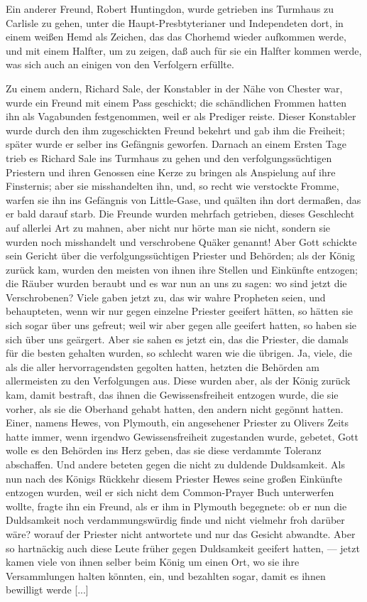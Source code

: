 Ein anderer Freund, Robert Huntingdon, wurde getrieben
ins Turmhaus zu Carlisle zu gehen, unter die Haupt-Presbtyterianer 
und Independeten dort, in einem weißen Hemd als
Zeichen, das das Chorhemd wieder aufkommen werde, und mit
einem Halfter, um zu zeigen, daß auch für sie ein Halfter kommen
werde, was sich auch an einigen von den Verfolgern erfüllte.

Zu einem andern, Richard Sale, der Konstabler in der Nähe
von Chester war, wurde ein Freund mit einem Pass geschickt;
die schändlichen \glqq Frommen\grqq{} hatten ihn als Vagabunden 
festgenommen, weil er als Prediger reiste. Dieser Konstabler wurde
durch den ihm zugeschickten Freund bekehrt und gab ihm die
Freiheit; später wurde er selber ins Gefängnis geworfen. Darnach
an einem Ersten Tage trieb es Richard Sale ins Turmhaus zu
gehen und den verfolgungssüchtigen Priestern und ihren Genossen
eine Kerze zu bringen als Anspielung auf ihre Finsternis; aber
sie misshandelten ihn, und, so recht wie verstockte \glqq Fromme\grqq{}, warfen
sie ihn ins Gefängnis von Little-Gase, und quälten ihn dort dermaßen,
das er bald darauf starb. Die Freunde wurden mehrfach getrieben, 
dieses Geschlecht auf allerlei Art zu mahnen, aber nicht
nur hörte man sie nicht, sondern sie wurden noch misshandelt und
\glqq verschrobene Quäker\grqq{} genannt! Aber Gott schickte sein Gericht
über die verfolgungssüchtigen Priester und Behörden; als der
König zurück kam, wurden den meisten von ihnen ihre Stellen und
Einkünfte entzogen; die Räuber wurden beraubt und es war nun
an uns zu sagen: \glqq wo sind jetzt die Verschrobenen?\grqq{} Viele gaben
jetzt zu, das wir wahre Propheten seien, und behaupteten, wenn
wir nur gegen einzelne Priester geeifert hätten, so hätten sie sich
sogar über uns gefreut; weil wir aber gegen alle geeifert hatten,
so haben sie sich über uns geärgert. Aber sie sahen es jetzt ein,
das die Priester, die damals für die besten gehalten wurden, so
schlecht waren wie die übrigen. Ja, viele, die als die aller 
hervorragendsten gegolten hatten, hetzten die Behörden am 
allermeisten zu den Verfolgungen aus. Diese wurden aber, als der
König zurück kam, damit bestraft, das ihnen die Gewissensfreiheit
entzogen wurde, die sie vorher, als sie die Oberhand gehabt hatten,
den andern nicht gegönnt hatten. Einer, namens Hewes, von
Plymouth, ein angesehener Priester zu Olivers Zeits hatte immer,
wenn irgendwo Gewissensfreiheit zugestanden wurde, gebetet, Gott
wolle es den Behörden ins Herz geben, das sie diese verdammte
Toleranz abschaffen. Und andere beteten gegen \glqq die nicht zu
duldende Duldsamkeit\grqq{}. Als nun nach des Königs Rückkehr
diesem Priester Hewes seine großen Einkünfte entzogen wurden,
weil er sich nicht dem Common-Prayer Buch unterwerfen wollte,
fragte ihn ein Freund, als er ihm in Plymouth begegnete: ob er
nun die Duldsamkeit noch verdammungswürdig finde und nicht
vielmehr froh darüber wäre? worauf der Priester nicht antwortete
und nur das Gesicht abwandte. Aber so hartnäckig auch diese
Leute früher gegen Duldsamkeit geeifert hatten, — jetzt kamen
viele von ihnen selber beim König um einen Ort, wo sie ihre
Versammlungen halten könnten, ein, und bezahlten sogar, damit
es ihnen bewilligt werde [...]

